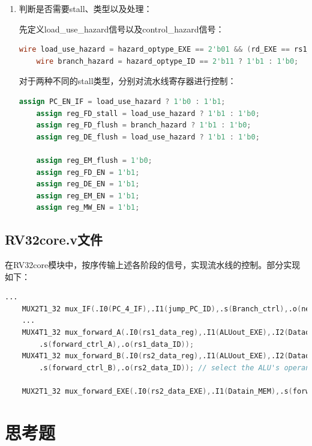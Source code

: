 \documentclass{article}
\begin{document}
\begin{enumerate}
    \item 判断是否需要stall、类型以及处理：\par
    先定义load\_use\_hazard信号以及control\_hazard信号：
\begin{lstlisting}[language=Verilog]
    wire load_use_hazard = hazard_optype_EXE == 2'b01 && (rd_EXE == rs1_ID || rd_EXE == rs2_ID) && rd_EXE != 5'b0 && hazard_optype_ID != 2'b10 ? 1'b1 : 1'b0;
    wire branch_hazard = hazard_optype_ID == 2'b11 ? 1'b1 : 1'b0;
\end{lstlisting}
    对于两种不同的stall类型，分别对流水线寄存器进行控制：
\begin{lstlisting}[language=Verilog]
    assign PC_EN_IF = load_use_hazard ? 1'b0 : 1'b1;
    assign reg_FD_stall = load_use_hazard ? 1'b1 : 1'b0;
    assign reg_FD_flush = branch_hazard ? 1'b1 : 1'b0;
    assign reg_DE_flush = load_use_hazard ? 1'b1 : 1'b0;                                                      

    assign reg_EM_flush = 1'b0;
    assign reg_FD_EN = 1'b1;
    assign reg_DE_EN = 1'b1;
    assign reg_EM_EN = 1'b1;
    assign reg_MW_EN = 1'b1;
\end{lstlisting}
\end{enumerate}

\subsection{RV32core.v文件}
在RV32core模块中，按序传输上述各阶段的信号，实现流水线的控制。部分实现如下：\par
\begin{lstlisting}[language=Verilog]
    ...
    MUX2T1_32 mux_IF(.I0(PC_4_IF),.I1(jump_PC_ID),.s(Branch_ctrl),.o(next_PC_IF)); // choose next PC according to the control signal
    ...
    MUX4T1_32 mux_forward_A(.I0(rs1_data_reg),.I1(ALUout_EXE),.I2(Dataout_MEM),.I3(Datain_MEM), 
        .s(forward_ctrl_A),.o(rs1_data_ID));
    MUX4T1_32 mux_forward_B(.I0(rs2_data_reg),.I1(ALUout_EXE),.I2(Dataout_MEM),.I3(Datain_MEM),
        .s(forward_ctrl_B),.o(rs2_data_ID)); // select the ALU's operand according to the forward_ctrl signal, realize forwarding

    MUX2T1_32 mux_forward_EXE(.I0(rs2_data_EXE),.I1(Datain_MEM),.s(forward_ctrl_ls),.o(Dataout_EXE)); // forward_ctrl_ls signal controls load-store forwarding
\end{lstlisting}

\section{思考题}
\end{document}
